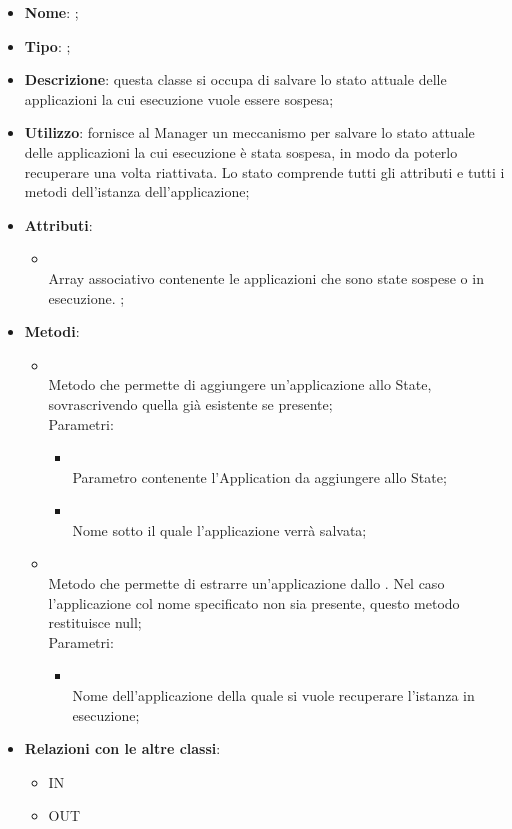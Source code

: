\begin{itemize}
	\item \textbf{Nome}: ;
	\item \textbf{Tipo}: ;
	\item \textbf{Descrizione}: questa classe si occupa di salvare lo stato attuale delle applicazioni la cui esecuzione vuole essere sospesa;
	\item \textbf{Utilizzo}: fornisce al Manager un meccanismo per salvare lo stato attuale delle applicazioni la cui esecuzione è stata sospesa, in modo da poterlo recuperare una volta riattivata. Lo stato comprende tutti gli attributi e tutti i metodi dell'istanza dell'applicazione;
	\item \textbf{Attributi}:
	\begin{itemize}
		\item[]  \\
		Array associativo contenente le applicazioni che sono state sospese o in esecuzione. ;
	\end{itemize}
	\item \textbf{Metodi}:
	\begin{itemize}
		\item[]  \\
		Metodo che permette di aggiungere un'applicazione allo State, sovrascrivendo quella già esistente se presente;\\
		Parametri:
		\begin{itemize}
			\item {} \\
			Parametro contenente l'Application da aggiungere allo State;
			\item {} \\
			Nome sotto il quale l'applicazione verrà salvata;
		\end{itemize}
		\item[]  \\
		Metodo che permette di estrarre un'applicazione dallo . Nel caso l'applicazione col nome specificato non sia presente, questo metodo restituisce null;\\
		Parametri:
		\begin{itemize}
			\item {} \\
			Nome dell'applicazione della quale si vuole recuperare l'istanza in esecuzione;
		\end{itemize}
	\end{itemize}
	\item \textbf{Relazioni con le altre classi}:
	\begin{itemize}
		\item IN \hyperlink{Manager_label}{}
		\item OUT \hyperlink{Application_label}{}
	\end{itemize}
\end{itemize}

